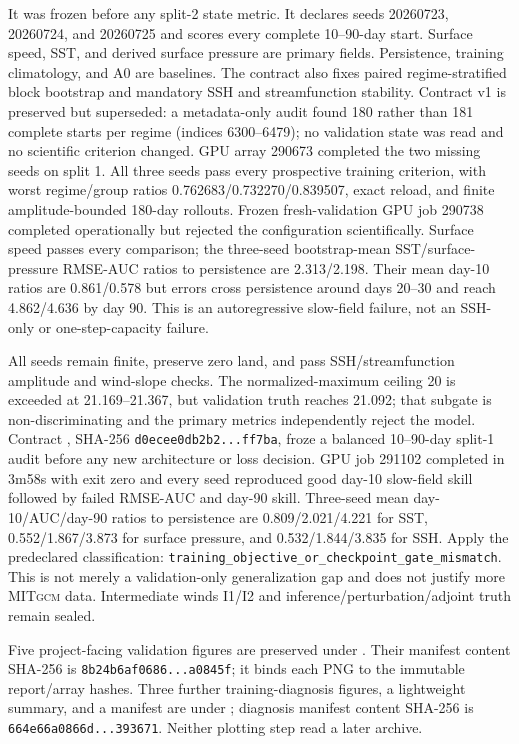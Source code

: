 \documentclass[11pt]{article}
\newcommand{\MITgcm}{\textsc{MITgcm}}
\begin{document}
It was frozen before any split-2 state metric.  It declares seeds 20260723, 20260724,
and 20260725 and scores every complete 10--90-day start.  Surface speed, SST, and
derived surface pressure are primary fields.  Persistence, training climatology, and
A0 are baselines.  The contract also fixes paired regime-stratified block bootstrap
and mandatory SSH and streamfunction stability.  Contract v1 is preserved but
superseded: a metadata-only
audit found 180 rather than 181 complete starts per regime (indices 6300--6479);
no validation state was read and no scientific criterion changed.  GPU array 290673
completed the two missing seeds on split 1.  All three seeds pass every prospective
training criterion, with worst regime/group ratios
0.762683/0.732270/0.839507, exact reload, and finite amplitude-bounded 180-day
rollouts.  Frozen fresh-validation GPU job 290738 completed operationally but rejected
the configuration scientifically.  Surface speed passes every comparison; the
three-seed bootstrap-mean SST/surface-pressure RMSE-AUC ratios to persistence are
2.313/2.198.  Their mean day-10 ratios are 0.861/0.578 but errors cross persistence
around days 20--30 and reach 4.862/4.636 by day 90.  This is an autoregressive
slow-field failure, not an SSH-only or one-step-capacity failure.

All seeds remain finite, preserve zero land, and pass SSH/streamfunction amplitude and
wind-slope checks.  The normalized-maximum ceiling 20 is exceeded at
21.169--21.367, but validation truth reaches 21.092; that subgate is
non-discriminating and the primary metrics independently reject the model.  Contract
, SHA-256
\texttt{d0ecee0db2b2...ff7ba}, froze a balanced 10--90-day split-1 audit before
any new architecture or loss decision.  GPU job 291102 completed in 3m58s with exit
zero and every seed reproduced good day-10 slow-field skill followed by failed
RMSE-AUC and day-90 skill.  Three-seed mean day-10/AUC/day-90 ratios to persistence
are 0.809/2.021/4.221 for SST, 0.552/1.867/3.873 for surface pressure, and
0.532/1.844/3.835 for SSH.  Apply the predeclared classification:
\texttt{training\_objective\_or\_checkpoint\_gate\_mismatch}.  This is not merely a
validation-only generalization gap and does not justify more \MITgcm{} data.
Intermediate winds I1/I2 and inference/perturbation/adjoint truth remain sealed.

Five project-facing validation figures are preserved under
.  Their manifest
content SHA-256 is \texttt{8b24b6af0686...a0845f}; it binds each PNG to the immutable
report/array hashes.  Three further training-diagnosis figures, a lightweight summary,
and a manifest are under ; diagnosis
manifest content SHA-256 is \texttt{664e66a0866d...393671}.  Neither plotting step read
a later archive.
\end{document}
